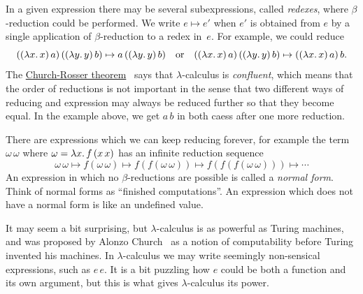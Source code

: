 In a given expression there may be several subexpressions, called
\emph{redexes}, where $\beta$-reduction could be performed. We write
$e \mapsto e'$ when $e'$ is obtained from $e$ by a single application
of $\beta$-reduction to a redex in~$e$. For example, we could reduce
%
\begin{equation*}
  ((\lambda x .\,x)\, a)\,((\lambda y .\,y)\,b) \mapsto
  a\, ((\lambda y .\,y)\,b)
  \quad\text{or}\quad
  ((\lambda x .\,x)\, a)\,((\lambda y .\,y)\,b) \mapsto
  ((\lambda x .\,x)\, a)\, b.
\end{equation*}
%
The \href{http://en.wikipedia.org/wiki/Church%E2%80%93Rosser_theorem}{Church-Rosser theorem}~\cite{church36:_some_proper_of_conver} says that
$\lambda$-calculus is \emph{confluent}, which means that the order of
reductions is not important in the sense that two different ways of
reducing and expression may always be reduced further so that they
become equal. In the example above, we get $a\,b$ in both caess after
one more reduction.

There are expressions which we can keep reducing forever, for example
the term $\omega\,\omega$ where $\omega = \lambda x .\,f\,(x\,x)$ has an
infinite reduction sequence
%
\begin{equation*}
  \omega\, \omega \mapsto
  f(\omega\, \omega) \mapsto 
  f(f(\omega\, \omega)) \mapsto 
  f(f(f(\omega\, \omega))) \mapsto
  \cdots
\end{equation*}
%
An expression in which no $\beta$-reductions are possible is called a
\emph{normal form}. Think of normal forms as ``finished
computations''. An expression which does not have a normal form is
like an undefined value.

It may seem a bit surprising, but $\lambda$-calculus is as powerful as
Turing machines, and was proposed by Alonzo Church~\cite{church32:_set_of_postul_for_found_of_logic} as a
notion of computability before Turing invented his machines. In
$\lambda$-calculus we may write seemingly non-sensical expressions,
such as $e\, e$. It is a bit puzzling how $e$ could be both a function
and its own argument, but this is what gives $\lambda$-calculus its
power.

